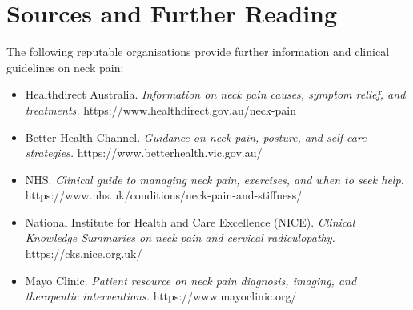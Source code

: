 \section*{Sources and Further Reading}
The following reputable organisations provide further information and clinical guidelines on neck pain:
\begin{itemize}
    \item Healthdirect Australia. \textit{Information on neck pain causes, symptom relief, and treatments.} https://www.healthdirect.gov.au/neck-pain
    \item Better Health Channel. \textit{Guidance on neck pain, posture, and self-care strategies.} https://www.betterhealth.vic.gov.au/
    \item NHS. \textit{Clinical guide to managing neck pain, exercises, and when to seek help.} https://www.nhs.uk/conditions/neck-pain-and-stiffness/
    \item National Institute for Health and Care Excellence (NICE). \textit{Clinical Knowledge Summaries on neck pain and cervical radiculopathy.} https://cks.nice.org.uk/
    \item Mayo Clinic. \textit{Patient resource on neck pain diagnosis, imaging, and therapeutic interventions.} https://www.mayoclinic.org/
\end{itemize}
